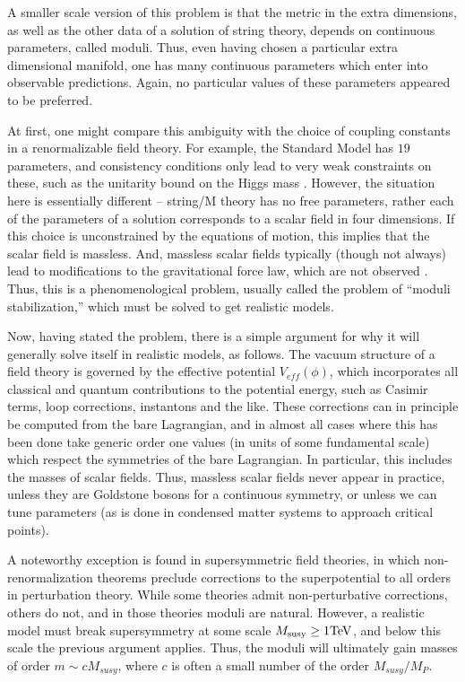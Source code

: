 \documentclass[aps,amsfonts]{ar2e}
\begin{document}
A smaller scale version of this problem is that the metric in the
extra dimensions, as well as the other data of a solution of string
theory, depends on continuous parameters, called moduli.  Thus, even
having chosen a particular extra dimensional manifold, one has many
continuous parameters which enter into observable predictions.
Again, no particular values of these parameters appeared to be
preferred.

At first, one might compare this ambiguity with the choice of
coupling constants in a renormalizable field theory.  For example,
the Standard Model has $19$ parameters, and consistency conditions
only lead to very weak constraints on these, such as the unitarity
bound on the Higgs mass
\cite{Chanowitz:1988ae}.
However, the situation
here is essentially different -- string/M theory has no free
parameters, rather each of the parameters of a solution corresponds
to a scalar field in four dimensions.  If this choice is
unconstrained by the equations of motion, this implies that the
scalar field is massless.  And,
massless scalar fields typically (though not always)
lead to modifications
to the gravitational force law, which are not observed
\cite{Adelberger:2003zx}.
Thus, this is a phenomenological problem, usually called the problem
of ``moduli stabilization,'' which must be solved to
get realistic models.

Now, having stated the problem, there is a simple argument for why
it will generally solve itself in realistic models, as follows.  The
vacuum structure of a field theory is governed by the effective
potential $V_{eff}(\phi)$, which incorporates all classical and
quantum contributions to the potential energy, such as Casimir
terms, loop corrections, instantons and the like.  These corrections
can in principle be computed from the bare Lagrangian, and in almost
all cases where this has been done take generic order one values (in
units of some fundamental scale) which respect the symmetries of the
bare Lagrangian.  In particular, this includes the masses of scalar
fields. Thus, massless scalar fields never appear in practice,
unless they are Goldstone bosons for a continuous symmetry, or
unless we can tune parameters (as is done in condensed matter
systems to approach critical points).

A noteworthy exception is found in supersymmetric field
theories, in which non-renormalization theorems preclude corrections
to the superpotential to all orders in perturbation theory.  While
some theories admit non-perturbative corrections, others do not, and
in those theories moduli are natural.  However, a realistic model
must break supersymmetry at some scale $M_{\rm susy} \ge 1 {\rm TeV}$,
and below this scale the previous argument applies.  Thus, the
moduli will ultimately gain masses of order $m \sim c M_{susy}$,
where $c$ is often a small number of the order $M_{susy}/M_{P}$.
\end{document}
